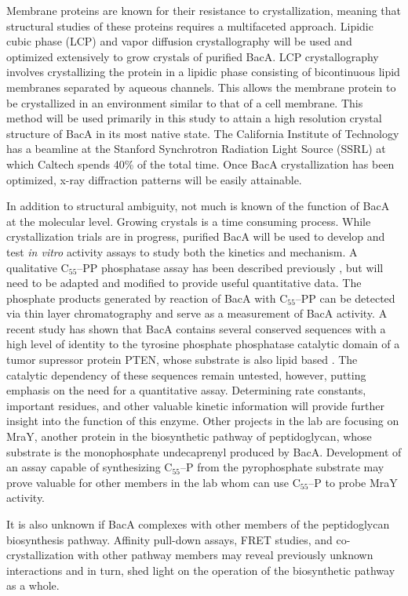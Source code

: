 \documentclass[12pt]{report}
\begin{document}
\indent Membrane proteins are known for their resistance to crystallization, meaning that structural studies of these proteins requires a multifaceted approach. Lipidic cubic phase (LCP) and vapor diffusion crystallography will be used and optimized extensively to grow crystals of purified BacA. LCP crystallography involves crystallizing the protein in a lipidic phase consisting of bicontinuous lipid membranes separated by aqueous channels. This allows the membrane protein to be crystallized in an environment similar to that of a cell membrane. This method will be used primarily in this study to attain a high resolution crystal structure of BacA in its most native state. The California Institute of Technology has a beamline at the Stanford Synchrotron Radiation Light Source (SSRL) at which Caltech spends 40\% of the total time. Once BacA crystallization has been optimized, x-ray diffraction patterns will be easily attainable.

\indent In addition to structural ambiguity, not much is known of the function of BacA at the molecular level. Growing crystals is a time consuming process. While crystallization trials are in progress, purified BacA will be used to develop and test {\it in vitro} activity assays to study both the kinetics and mechanism. A qualitative C$_{55}$--PP phosphatase assay has been described previously \cite{Ghachi}, but will need to be adapted and modified to provide useful quantitative data. The phosphate products generated by reaction of BacA with C$_{55}$--PP can be detected via thin layer chromatography and serve as a measurement of BacA activity. A recent study has shown that BacA contains several conserved sequences with a high level of identity to the tyrosine phosphate phosphatase catalytic domain of a tumor supressor protein PTEN, whose substrate is also lipid based \cite{Bickford}. The catalytic dependency of these sequences remain untested, however, putting emphasis on the need for a quantitative assay. Determining rate constants, important residues, and other valuable kinetic information will provide further insight into the function of this enzyme. Other projects in the lab are focusing on MraY, another protein in the biosynthetic pathway of peptidoglycan, whose substrate is the monophosphate undecaprenyl produced by BacA. Development of an assay capable of synthesizing C$_{55}$--P from the pyrophosphate substrate may prove valuable for other members in the lab whom can use C$_{55}$--P to probe MraY activity.

\indent It is also unknown if BacA complexes with other members of the peptidoglycan biosynthesis pathway. Affinity pull-down assays, FRET studies, and co-crystallization with other pathway members may reveal previously unknown interactions and in turn, shed light on the operation of the biosynthetic pathway as a whole.
\end{document}
